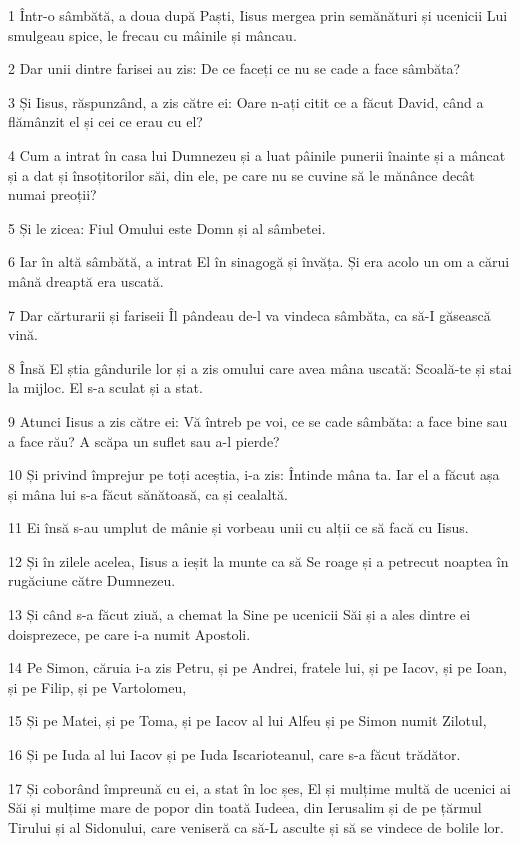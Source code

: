 \par 1 Într-o sâmbătă, a doua după Paști, Iisus mergea prin semănături și ucenicii Lui smulgeau spice, le frecau cu mâinile și mâncau.
\par 2 Dar unii dintre farisei au zis: De ce faceți ce nu se cade a face sâmbăta?
\par 3 Și Iisus, răspunzând, a zis către ei: Oare n-ați citit ce a făcut David, când a flămânzit el și cei ce erau cu el?
\par 4 Cum a intrat în casa lui Dumnezeu și a luat pâinile punerii înainte și a mâncat și a dat și însoțitorilor săi, din ele, pe care nu se cuvine să le mănânce decât numai preoții?
\par 5 Și le zicea: Fiul Omului este Domn și al sâmbetei.
\par 6 Iar în altă sâmbătă, a intrat El în sinagogă și învăța. Și era acolo un om a cărui mână dreaptă era uscată.
\par 7 Dar cărturarii și fariseii Îl pândeau de-l va vindeca sâmbăta, ca să-I găsească vină.
\par 8 Însă El știa gândurile lor și a zis omului care avea mâna uscată: Scoală-te și stai la mijloc. El s-a sculat și a stat.
\par 9 Atunci Iisus a zis către ei: Vă întreb pe voi, ce se cade sâmbăta: a face bine sau a face rău? A scăpa un suflet sau a-l pierde?
\par 10 Și privind împrejur pe toți aceștia, i-a zis: Întinde mâna ta. Iar el a făcut așa și mâna lui s-a făcut sănătoasă, ca și cealaltă.
\par 11 Ei însă s-au umplut de mânie și vorbeau unii cu alții ce să facă cu Iisus.
\par 12 Și în zilele acelea, Iisus a ieșit la munte ca să Se roage și a petrecut noaptea în rugăciune către Dumnezeu.
\par 13 Și când s-a făcut ziuă, a chemat la Sine pe ucenicii Săi și a ales dintre ei doisprezece, pe care i-a numit Apostoli.
\par 14 Pe Simon, căruia i-a zis Petru, și pe Andrei, fratele lui, și pe Iacov, și pe Ioan, și pe Filip, și pe Vartolomeu,
\par 15 Și pe Matei, și pe Toma, și pe Iacov al lui Alfeu și pe Simon numit Zilotul,
\par 16 Și pe Iuda al lui Iacov și pe Iuda Iscarioteanul, care s-a făcut trădător.
\par 17 Și coborând împreună cu ei, a stat în loc șes, El și mulțime multă de ucenici ai Săi și mulțime mare de popor din toată Iudeea, din Ierusalim și de pe țărmul Tirului și al Sidonului, care veniseră ca să-L asculte și să se vindece de bolile lor.
